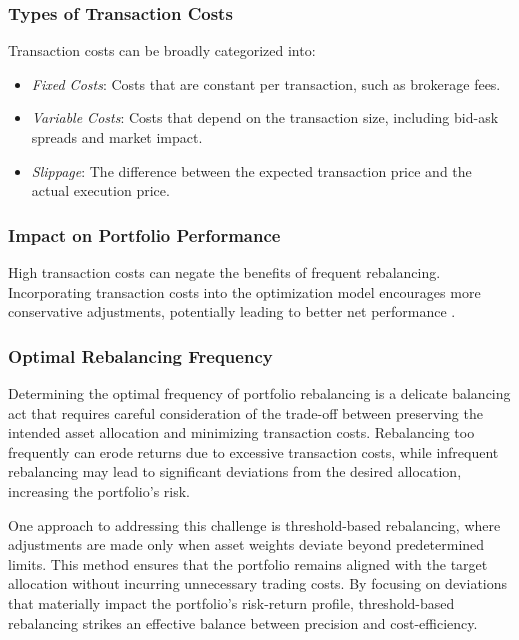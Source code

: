 \subsubsection{Types of Transaction Costs}

Transaction costs can be broadly categorized into:

\begin{itemize}
    \item \textit{Fixed Costs}: Costs that are constant per transaction, such as brokerage fees.
    \item \textit{Variable Costs}: Costs that depend on the transaction size, including bid-ask spreads and market impact.
    \item \textit{Slippage}: The difference between the expected transaction price and the actual execution price.
\end{itemize}

\subsubsection{Impact on Portfolio Performance}

High transaction costs can negate the benefits of frequent rebalancing. Incorporating transaction costs into the optimization model encourages more conservative adjustments, potentially leading to better net performance \cite{garleanu2009dynamic}.

\subsubsection{Optimal Rebalancing Frequency}

Determining the optimal frequency of portfolio rebalancing is a delicate balancing act that requires careful consideration of the trade-off between preserving the intended asset allocation and minimizing transaction costs. Rebalancing too frequently can erode returns due to excessive transaction costs, while infrequent rebalancing may lead to significant deviations from the desired allocation, increasing the portfolio’s risk.

One approach to addressing this challenge is threshold-based rebalancing, where adjustments are made only when asset weights deviate beyond predetermined limits. This method ensures that the portfolio remains aligned with the target allocation without incurring unnecessary trading costs. By focusing on deviations that materially impact the portfolio's risk-return profile, threshold-based rebalancing strikes an effective balance between precision and cost-efficiency.

